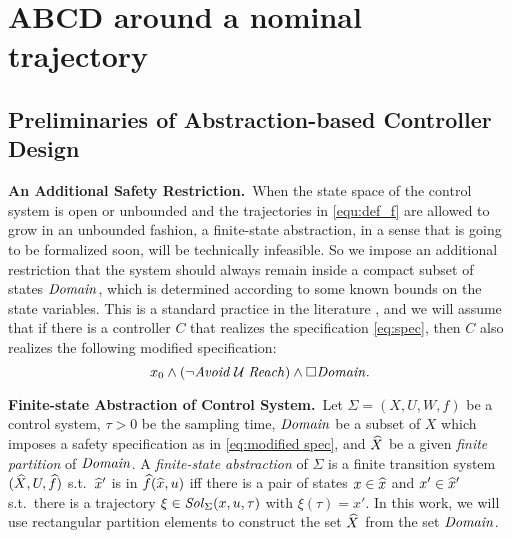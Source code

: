 
\section{ABCD around a nominal trajectory}

\subsection{Preliminaries of Abstraction-based Controller Design}

\smallskip
\noindent\textbf{An Additional Safety Restriction.}\
When the state space of the control system is open or unbounded and the trajectories in \eqref{equ:def_f} are allowed to grow in an unbounded fashion, a finite-state abstraction, in a sense that is going to be formalized soon, will be technically infeasible.
So we impose an additional restriction that the system should always remain inside a compact subset of states $\mathit{Domain}$, which is determined according to some known bounds on the state variables.
This is a standard practice in the literature \cite{FRR}, and we will assume that if there is a controller $C$ that realizes the specification \eqref{eq:spec}, then $C$ also realizes the following modified specification:
\begin{equation}\label{eq:modified spec}
	x_0 \wedge (\lnot \mathit{Avoid} \; \mathcal{U} \; \mathit{Reach}) \wedge \square \mathit{Domain}.
\end{equation}

\smallskip
\noindent\textbf{Finite-state Abstraction of Control System.}\
Let $\Sigma = (X, U, W, f)$ be a control system, $\tau>0$ be the sampling time, $\mathit{Domain}$ be a subset of $X$ which imposes a safety specification as in \eqref{eq:modified spec}, and $\widehat{X}$ be a given \emph{finite partition} of $\mathit{Domain}$.
A \emph{finite-state abstraction} of $\Sigma$ is a finite transition system $(\widehat{X},U,\widehat{f})$ s.t.\ $\widehat{x}'$ is in $\widehat{f}(\widehat{x},u)$ iff there is a pair of states $x\in \widehat{x}$ and $x'\in \widehat{x}'$ s.t.\ there is a trajectory $\xi\in \mathit{Sol}_\Sigma(x,u,\tau)$ with $\xi(\tau)=x'$.
In this work, we will use rectangular partition elements to construct the set $\widehat{X}$ from the set $\mathit{Domain}$.

